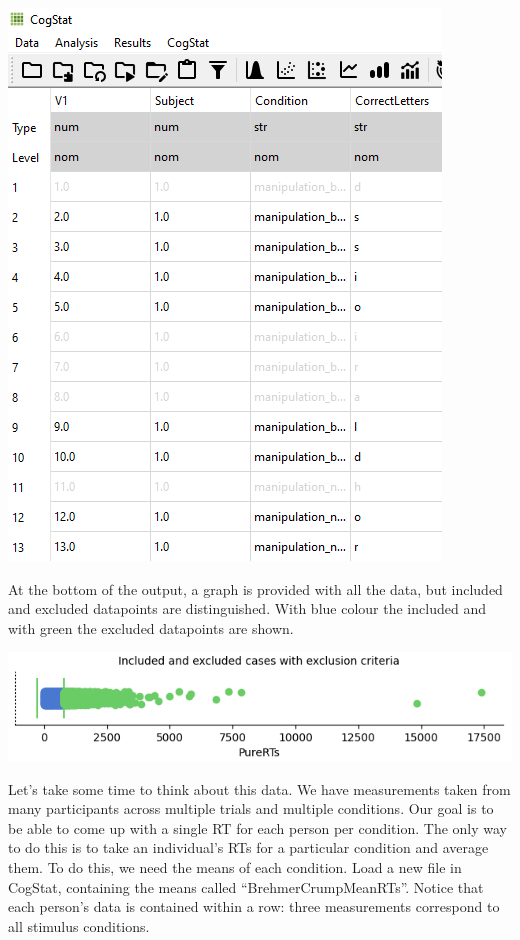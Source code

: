 \documentclass[
]{book}
\begin{document}
\includegraphics{img/ch9/9.3filteroutliers_dataset.png}

At the bottom of the output, a graph is provided with all the data, but included and excluded datapoints are distinguished. With blue colour the included and with green the excluded datapoints are shown.

\includegraphics{img/ch9/9.3filteroutliers_plot.png}

Let's take some time to think about this data. We have measurements taken from many participants across multiple trials and multiple conditions. Our goal is to be able to come up with a single RT for each person per condition. The only way to do this is to take an individual's RTs for a particular condition and average them. To do this, we need the means of each condition. Load a new file in CogStat, containing the means called ``BrehmerCrumpMeanRTs''. Notice that each person's data is contained within a row: three measurements correspond to all stimulus conditions.
\end{document}
